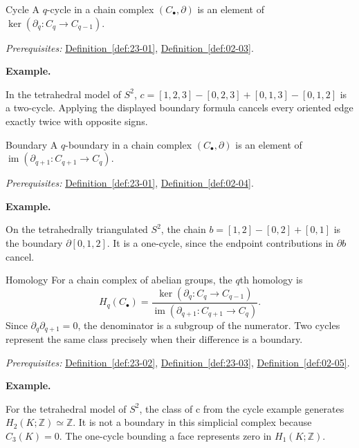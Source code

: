 \documentclass[11pt]{article}
\makeatletter
\newcounter{definition}
\newcommand{\Z}{\mathbb Z}
\newcommand{\exampleheading}{\par\medskip\textbf{Example.}\par\smallskip}
\newcommand{\currentdefinition}[1]{\protected@edef\@currentlabel{#1}}
\makeatother
\begin{document}
\begin{definitionbox}{Cycle}
\currentdefinition{\thedefinition}
\label{def:23-02}
A $q$-cycle in a chain complex $(C_\bullet,\partial)$ is an element of $\ker(\partial_q:C_q\to C_{q-1})$.

\smallskip
\textit{Prerequisites:} \hyperref[def:23-01]{Definition~\ref*{def:23-01}}, \hyperref[def:02-03]{Definition~\ref*{def:02-03}}.

\exampleheading
In the tetrahedral model of $S^2$, $c=[1,2,3]-[0,2,3]+[0,1,3]-[0,1,2]$ is a two-cycle. Applying the displayed boundary formula cancels every oriented edge exactly twice with opposite signs.
\end{definitionbox}

\begin{definitionbox}{Boundary}
\currentdefinition{\thedefinition}
\label{def:23-03}
A $q$-boundary in a chain complex $(C_\bullet,\partial)$ is an element of $\operatorname{im}(\partial_{q+1}:C_{q+1}\to C_q)$.

\smallskip
\textit{Prerequisites:} \hyperref[def:23-01]{Definition~\ref*{def:23-01}}, \hyperref[def:02-04]{Definition~\ref*{def:02-04}}.

\exampleheading
On the tetrahedrally triangulated $S^2$, the chain $b=[1,2]-[0,2]+[0,1]$ is the boundary $\partial[0,1,2]$. It is a one-cycle, since the endpoint contributions in $\partial b$ cancel.
\end{definitionbox}

\begin{definitionbox}{Homology}
\currentdefinition{\thedefinition}
\label{def:23-04}
For a chain complex of abelian groups, the $q$th homology is
\[H_q(C_\bullet)=\frac{\ker(\partial_q:C_q\to C_{q-1})}{\operatorname{im}(\partial_{q+1}:C_{q+1}\to C_q)}.\]
Since $\partial_q\partial_{q+1}=0$, the denominator is a subgroup of the numerator. Two cycles represent the same class precisely when their difference is a boundary.

\smallskip
\textit{Prerequisites:} \hyperref[def:23-02]{Definition~\ref*{def:23-02}}, \hyperref[def:23-03]{Definition~\ref*{def:23-03}}, \hyperref[def:02-05]{Definition~\ref*{def:02-05}}.

\exampleheading
For the tetrahedral model of $S^2$, the class of c from the cycle example generates $H_2(K;\Z)\simeq\Z$. It is not a boundary in this simplicial complex because $C_3(K)=0$. The one-cycle bounding a face represents zero in $H_1(K;\Z)$.
\end{definitionbox}
\end{document}
